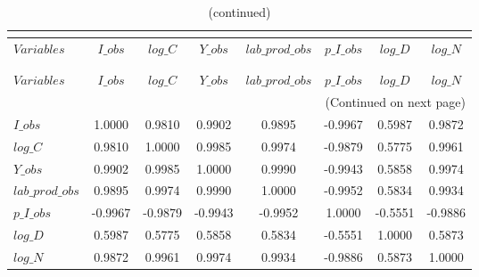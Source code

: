  
\begin{center}
\begin{longtable}{lccccccc} 
\caption{MATRIX OF CORRELATIONS}\\
 \label{Table:th_corr_matrix}\\
\toprule 
$Variables       $	 & 	 $           I\_obs$	 & 	 $           log\_C$	 & 	 $           Y\_obs$	 & 	 $  lab\_prod\_obs$	 & 	 $       p\_I\_obs$	 & 	 $           log\_D$	 & 	 $           log\_N$\\
\midrule \endfirsthead 
\caption{(continued)}\\
 \toprule \\ 
$Variables       $	 & 	 $           I\_obs$	 & 	 $           log\_C$	 & 	 $           Y\_obs$	 & 	 $  lab\_prod\_obs$	 & 	 $       p\_I\_obs$	 & 	 $           log\_D$	 & 	 $           log\_N$\\
\midrule \endhead 
\midrule \multicolumn{8}{r}{(Continued on next page)} \\ \bottomrule \endfoot 
\bottomrule \endlastfoot 
$I\_obs          $	 & 	            1.0000	 & 	            0.9810	 & 	            0.9902	 & 	            0.9895	 & 	           -0.9967	 & 	            0.5987	 & 	            0.9872 \\ 
$log\_C          $	 & 	            0.9810	 & 	            1.0000	 & 	            0.9985	 & 	            0.9974	 & 	           -0.9879	 & 	            0.5775	 & 	            0.9961 \\ 
$Y\_obs          $	 & 	            0.9902	 & 	            0.9985	 & 	            1.0000	 & 	            0.9990	 & 	           -0.9943	 & 	            0.5858	 & 	            0.9974 \\ 
$lab\_prod\_obs  $	 & 	            0.9895	 & 	            0.9974	 & 	            0.9990	 & 	            1.0000	 & 	           -0.9952	 & 	            0.5834	 & 	            0.9934 \\ 
$p\_I\_obs       $	 & 	           -0.9967	 & 	           -0.9879	 & 	           -0.9943	 & 	           -0.9952	 & 	            1.0000	 & 	           -0.5551	 & 	           -0.9886 \\ 
$log\_D          $	 & 	            0.5987	 & 	            0.5775	 & 	            0.5858	 & 	            0.5834	 & 	           -0.5551	 & 	            1.0000	 & 	            0.5873 \\ 
$log\_N          $	 & 	            0.9872	 & 	            0.9961	 & 	            0.9974	 & 	            0.9934	 & 	           -0.9886	 & 	            0.5873	 & 	            1.0000 \\ 
\end{longtable}
 \end{center}
